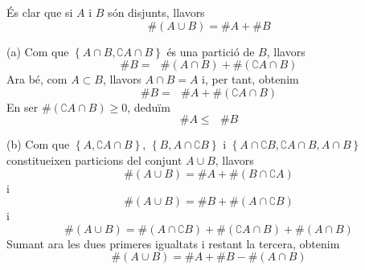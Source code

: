 \begin{solucio}
És clar que si $A$ i $B$ són disjunts, llavors%
\begin{equation*}
\#\left( A\cup B\right) =\#A+\#B
\end{equation*}

(a) Com que $\left\{ A\cap B,\complement A\cap B\right\} $ és una partició de $B$, llavors%
\begin{equation*}
\#B=\text{ }\#\left( A\cap B\right) +\#\left( \complement A\cap B\right)
\end{equation*}%
Ara bé, com $A\subset B$, llavors $A\cap B=A$ i, per tant, obtenim%
\begin{equation*}
\#B=\text{ }\#A+\#\left( \complement A\cap B\right)
\end{equation*}%
En ser $\#\left( \complement A\cap B\right) \geq 0$, deduïm%
\begin{equation*}
\#A\leq \text{ }\#B
\end{equation*}

(b) Com que $\left\{ A,\complement A\cap B\right\} $, $\left\{ B,A\cap
\complement B\right\} $ i $\left\{ A\cap \complement B,\complement A\cap
B,A\cap B\right\} $ constitueixen particions del conjunt $A\cup B$, llavors%
\begin{equation*}
\#\left( A\cup B\right) =\#A+\#\left( B\cap \complement A\right)
\end{equation*}%
i%
\begin{equation*}
\#\left( A\cup B\right) =\#B+\#\left( A\cap \complement B\right)
\end{equation*}%
i%
\begin{equation*}
\#\left( A\cup B\right) =\#\left( A\cap \complement B\right) +\#\left(
\complement A\cap B\right) +\#\left( A\cap B\right)
\end{equation*}%
Sumant ara les dues primeres igualtats i restant la tercera, obtenim%
\begin{equation*}
\#\left( A\cup B\right) =\#A+\#B-\#\left( A\cap B\right)
\end{equation*}


\end{solucio}
